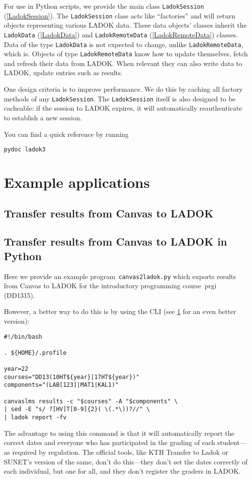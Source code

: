 \documentclass[a4paper,oneside]{memoir}
\begin{document}
For use in Python scripts,
we provide the main class \texttt{LadokSession} (\cref{LadokSession}).
The \texttt{LadokSession} class acts like \enquote{factories} and will return 
objects representing various LADOK data.
These data objects' classes inherit the \texttt{LadokData} (\cref{LadokData}) 
and \texttt{LadokRemoteData} (\cref{LadokRemoteData}) classes.
Data of the type \texttt{LadokData} is not expected to change, unlike 
\texttt{LadokRemoteData}, which is.
Objects of type \texttt{LadokRemoteData} know how to update themselves, \ie fetch 
and refresh their data from LADOK.
When relevant they can also write data to LADOK, \ie update entries such as 
results.

One design criteria is to improve performance.
We do this by caching all factory methods of any \texttt{LadokSession}.
The \texttt{LadokSession} itself is also designed to be cacheable: if the session to 
LADOK expires, it will automatically reauthenticate to establish a new session.

You can find a quick reference by running
\begin{verbatim}
pydoc ladok3
\end{verbatim}



\part{Example applications}

\chapter{Transfer results from Canvas to LADOK}\label{SomeScripts}



\chapter{Transfer results from Canvas to LADOK in Python}

Here we provide an example program~\texttt{canvas2ladok.py} which exports 
results from Canvas to LADOK for the introductory programming course~prgi 
(DD1315).

However, a better way to do this is by using the CLI
(see \cref{SomeScripts} for an even better version):
\begin{verbatim}
#!/bin/bash

. ${HOME}/.profile

year=22
courses="DD13(10HT${year}|17HT${year})"
components="(LAB[123]|MAT1|KAL1)"

canvaslms results -c "$courses" -A "$components" \
| sed -E "s/ ?[HV]T[0-9]{2}( \(.*\))?//" \
| ladok report -fv
\end{verbatim}
The advantage to using this command is that it will automatically report the 
correct dates and everyone who has participated in the grading of each 
student---as required by regulation.
The official tools, like KTH Transfer to Ladok or SUNET's version of the same, 
don't do this---they don't set the dates correctly of each individual, but one 
for all, and they don't register the graders in LADOK.
\end{document}
